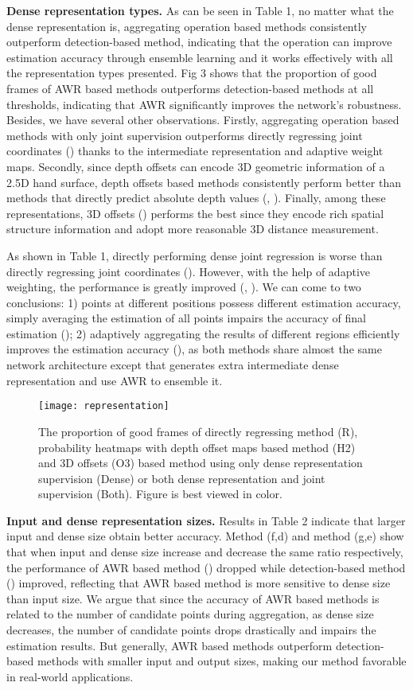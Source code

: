\documentclass[letterpaper]{article} \usepackage{aaai20}  \usepackage{times}  \usepackage{helvet} \usepackage{courier}  \usepackage[hyphens]{url}  \usepackage{graphicx} \usepackage{amsmath}
\begin{document}
\textbf{Dense representation types.} As can be seen in Table 1, no matter what the dense representation is, aggregating operation based methods consistently outperform detection-based method, indicating that the operation can improve estimation accuracy through ensemble learning and it works effectively with all the representation types presented. Fig 3 shows that the proportion of good frames of AWR based methods outperforms detection-based methods at all thresholds, indicating that AWR significantly improves the network's robustness. Besides, we have several other observations. Firstly, aggregating operation based methods with only joint supervision outperforms directly regressing joint coordinates () thanks to the intermediate representation and adaptive weight maps. Secondly, since depth offsets can encode 3D geometric information of a 2.5D hand surface, depth offsets based methods consistently perform better than methods that directly predict absolute depth values (, ). Finally, among these representations, 3D offsets () performs the best since they encode rich spatial structure information and adopt more reasonable 3D distance measurement.

As shown in Table 1, directly performing dense joint regression is worse than directly regressing joint coordinates (). However, with the help of adaptive weighting, the performance is greatly improved (, ). We can come to two conclusions: 1) points at different positions possess different estimation accuracy, simply averaging the estimation of all points impairs the accuracy of final estimation (); 2) adaptively aggregating the results of different regions efficiently improves the estimation accuracy (), as both methods share almost the same network architecture except that  generates extra intermediate dense representation and use AWR to ensemble it. 


\begin{figure}[t]
\centering
\texttt{[image: representation]} 
\caption{The proportion of good frames of directly regressing method (R), probability heatmaps with depth offset maps based method (H2) and 3D offsets (O3) based method using only dense representation supervision (Dense) or both dense representation and joint supervision (Both). Figure is best viewed in color.}
\end{figure}


\textbf{Input and dense representation sizes.} Results in Table 2 indicate that larger input and dense size obtain better accuracy. Method (f,d) and method (g,e) show that when input and dense size increase and decrease the same ratio respectively, the performance of AWR based method () dropped while detection-based method () improved, reflecting that AWR based method is more sensitive to dense size than input size. We argue that since the accuracy of AWR based methods is related to the number of candidate points during aggregation, as dense size decreases, the number of candidate points drops drastically and impairs the estimation results. But generally, AWR based methods outperform detection-based methods with smaller input and output sizes, making our method favorable in real-world applications.
\end{document}

